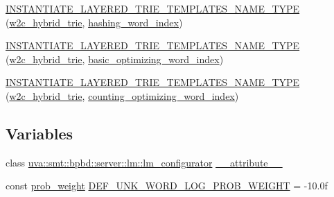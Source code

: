 \begin{DoxyCompactItemize}
\hyperlink{namespaceuva_1_1smt_1_1bpbd_1_1server_1_1lm_a2d343f736eb671193ec43f66f521d3d8}{I\+N\+S\+T\+A\+N\+T\+I\+A\+T\+E\+\_\+\+L\+A\+Y\+E\+R\+E\+D\+\_\+\+T\+R\+I\+E\+\_\+\+T\+E\+M\+P\+L\+A\+T\+E\+S\+\_\+\+N\+A\+M\+E\+\_\+\+T\+Y\+P\+E} (\hyperlink{classuva_1_1smt_1_1bpbd_1_1server_1_1lm_1_1w2c__hybrid__trie}{w2c\+\_\+hybrid\+\_\+trie}, \hyperlink{classuva_1_1smt_1_1bpbd_1_1server_1_1lm_1_1dictionary_1_1hashing__word__index}{hashing\+\_\+word\+\_\+index})
\item 
\hyperlink{namespaceuva_1_1smt_1_1bpbd_1_1server_1_1lm_ae03b742cc1e2cffa13ad1db07828af60}{I\+N\+S\+T\+A\+N\+T\+I\+A\+T\+E\+\_\+\+L\+A\+Y\+E\+R\+E\+D\+\_\+\+T\+R\+I\+E\+\_\+\+T\+E\+M\+P\+L\+A\+T\+E\+S\+\_\+\+N\+A\+M\+E\+\_\+\+T\+Y\+P\+E} (\hyperlink{classuva_1_1smt_1_1bpbd_1_1server_1_1lm_1_1w2c__hybrid__trie}{w2c\+\_\+hybrid\+\_\+trie}, \hyperlink{namespaceuva_1_1smt_1_1bpbd_1_1server_1_1lm_1_1dictionary_a3001583c904eec702b4a4125082a7ecd}{basic\+\_\+optimizing\+\_\+word\+\_\+index})
\item 
\hyperlink{namespaceuva_1_1smt_1_1bpbd_1_1server_1_1lm_a64e971c7d7f5b39fd63e70d2d5784483}{I\+N\+S\+T\+A\+N\+T\+I\+A\+T\+E\+\_\+\+L\+A\+Y\+E\+R\+E\+D\+\_\+\+T\+R\+I\+E\+\_\+\+T\+E\+M\+P\+L\+A\+T\+E\+S\+\_\+\+N\+A\+M\+E\+\_\+\+T\+Y\+P\+E} (\hyperlink{classuva_1_1smt_1_1bpbd_1_1server_1_1lm_1_1w2c__hybrid__trie}{w2c\+\_\+hybrid\+\_\+trie}, \hyperlink{namespaceuva_1_1smt_1_1bpbd_1_1server_1_1lm_1_1dictionary_a61cbd647b15de785ccf4cdd26661c366}{counting\+\_\+optimizing\+\_\+word\+\_\+index})
\end{DoxyCompactItemize}
\subsection*{Variables}
\begin{DoxyCompactItemize}
\item 
class \hyperlink{classuva_1_1smt_1_1bpbd_1_1server_1_1lm_1_1lm__configurator}{uva\+::smt\+::bpbd\+::server\+::lm\+::lm\+\_\+configurator} \hyperlink{namespaceuva_1_1smt_1_1bpbd_1_1server_1_1lm_a118bbc146a82483b1a6da28b43c5df06}{\+\_\+\+\_\+attribute\+\_\+\+\_\+}
\item 
const \hyperlink{namespaceuva_1_1smt_1_1bpbd_1_1server_a01e9ea4de9c226f4464862e84ff0bbcc}{prob\+\_\+weight} \hyperlink{namespaceuva_1_1smt_1_1bpbd_1_1server_1_1lm_a6de1c7e176aa41057187126069624cf7}{D\+E\+F\+\_\+\+U\+N\+K\+\_\+\+W\+O\+R\+D\+\_\+\+L\+O\+G\+\_\+\+P\+R\+O\+B\+\_\+\+W\+E\+I\+G\+H\+T} = -\/10.\+0f
\end{DoxyCompactItemize}


